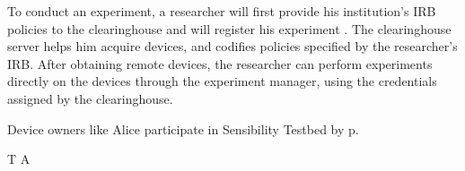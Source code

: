 {{To conduct an experiment, a researcher will first provide his institution's IRB policies to the clearinghouse and will register his experiment .  
The clearinghouse server helps him acquire devices, and codifies policies specified by the researcher's IRB. After obtaining remote devices, the researcher can perform
experiments directly on the devices through the experiment manager, using the credentials assigned by the clearinghouse. 



Device owners like Alice participate in Sensibility Testbed by p.

T%
A


}}
